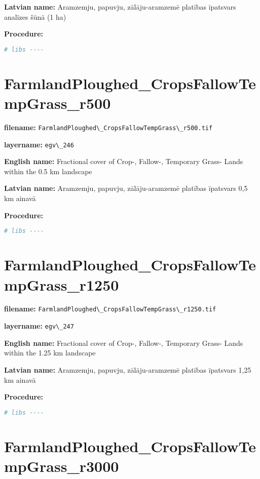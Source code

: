 \documentclass[
]{book}
\newcommand{\passthrough}[1]{#1}
\begin{document}
\textbf{Latvian name:} Aramzemju, papuvju, zālāju-aramzemē platības īpatsvars analīzes šūnā (1 ha)

\textbf{Procedure:}

\begin{lstlisting}[language=R]
# libs ----
\end{lstlisting}

\section{FarmlandPloughed\_CropsFallowTempGrass\_r500}\label{ch06.246}

\textbf{filename:} \passthrough{\lstinline!FarmlandPloughed\_CropsFallowTempGrass\_r500.tif!}

\textbf{layername:} \passthrough{\lstinline!egv\_246!}

\textbf{English name:} Fractional cover of Crop-, Fallow-, Temporary Grass- Lands within the 0.5 km landscape

\textbf{Latvian name:} Aramzemju, papuvju, zālāju-aramzemē platības īpatsvars 0,5 km ainavā

\textbf{Procedure:}

\begin{lstlisting}[language=R]
# libs ----
\end{lstlisting}

\section{FarmlandPloughed\_CropsFallowTempGrass\_r1250}\label{ch06.247}

\textbf{filename:} \passthrough{\lstinline!FarmlandPloughed\_CropsFallowTempGrass\_r1250.tif!}

\textbf{layername:} \passthrough{\lstinline!egv\_247!}

\textbf{English name:} Fractional cover of Crop-, Fallow-, Temporary Grass- Lands within the 1.25 km landscape

\textbf{Latvian name:} Aramzemju, papuvju, zālāju-aramzemē platības īpatsvars 1,25 km ainavā

\textbf{Procedure:}

\begin{lstlisting}[language=R]
# libs ----
\end{lstlisting}

\section{FarmlandPloughed\_CropsFallowTempGrass\_r3000}\label{ch06.248}
\end{document}

